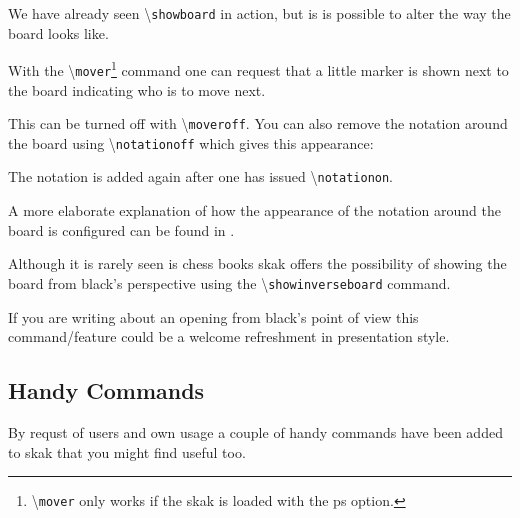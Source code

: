 \documentclass[10pt]{article}
\makeatletter
\renewcommand\showboard{\print@board}
\let\ORIshowboard\showboard
\renewcommand\showboard{%
    \makebox[8\squarelength]{%
    \rule{0pt}{9\squarelength}%
    \begin{postscript}%
    [trim = \squarelength{} 0pt \squarelength{} 0pt]
    \ORIshowboard
    \end{postscript}}}
\newcommand{\package}[1]{\textsf{#1}}
\newcommand{\command}[1]{\textbackslash\texttt{#1}}
\makeatother
\begin{document}
We have already seen \command{showboard} in action, but is is possible
to alter the way the board looks like.

With the \command{mover}\footnote{\command{mover} only works if the \package{skak} is loaded with the ps option.} command one can request that a little marker
is shown next to the board indicating who is to move next.

\begin{LTXexample}
\newgame

\showboard

\end{LTXexample}

\begin{LTXexample}%


\showboard
\end{LTXexample}

This can be turned off with \command{moveroff}. You can also remove
the notation around the board using \command{notationoff} which gives
this appearance:

\begin{LTXexample}
\newgame
\notationoff
\showboard

\end{LTXexample}

The notation is added again after one has issued
\command{notationon}. \notationon

A more elaborate explanation of how the appearance of the notation
around the board is configured can be found in \cite{chessnfss}.

Although it is rarely seen is chess books \package{skak} offers
the possibility of showing the board from black's perspective
using the
\command{showinverseboard} command.

\begin{LTXexample}
\newgame
\showboard

\end{LTXexample}

If you are writing about an opening from black's point of view this
command/feature could be a welcome refreshment in presentation style.


\subsection{Handy Commands}
\label{sec:handycommands}

By requst of users and own usage a couple of handy commands have been
added to \package{skak} that you might find useful too.
\end{document}
